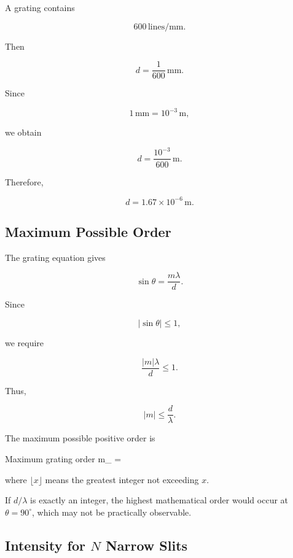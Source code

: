 \documentclass{studentnotes}
\begin{document}
\begin{example}
    A grating contains

    \[
        600\,\text{lines/mm}.
    \]

    Then

    \[
        d
        =
        \frac{1}{600}\,\text{mm}.
    \]

    Since

    \[
        1\,\text{mm}=10^{-3}\,\text{m},
    \]

    we obtain

    \[
        d
        =
        \frac{10^{-3}}{600}\,\text{m}.
    \]

    Therefore,

    \[
        \boxed{
            d=1.67\times10^{-6}\,\text{m}.
        }
    \]
\end{example}

\subsection{Maximum Possible Order}

The grating equation gives

\[
    \sin\theta=\frac{m\lambda}{d}.
\]

Since

\[
    |\sin\theta|\leq1,
\]

we require

\[
    \frac{|m|\lambda}{d}\leq1.
\]

Thus,

\[
    |m|\leq\frac{d}{\lambda}.
\]

The maximum possible positive order is

\begin{namedformula}{Maximum grating order}
    m_{\max}
    =
    \left\lfloor%
    \right\rfloor%
\end{namedformula}

where \(\lfloor x\rfloor\) means the greatest integer not exceeding \(x\).

\begin{quicknote}
    If \(d/\lambda\) is exactly an integer, the highest mathematical order would occur at \(\theta=90^\circ\), which may not be practically observable.
\end{quicknote}

\subsection{Intensity for \texorpdfstring{\(N\)}{N} Narrow Slits}
\end{document}
